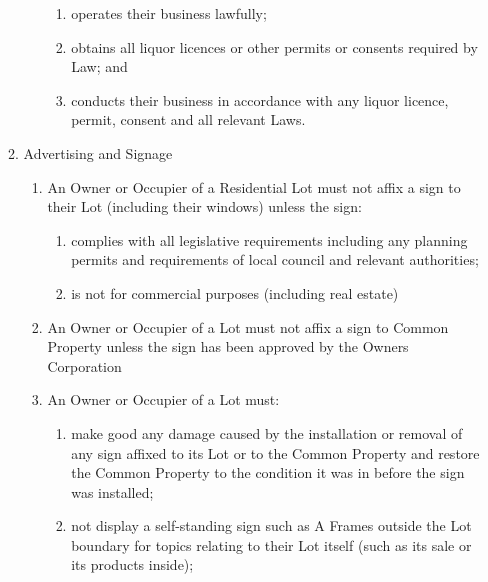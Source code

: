 \documentclass{article}
\begin{document}
\begin{enumerate}[label=\arabic*.]
\begin{enumerate}[label=\arabic{enumi}.\arabic*.]
\begin{enumerate}[label=(\arabic*)]
\begin{enumerate}[label=(\alph*)]

\item  operates their business lawfully;

\item  obtains all liquor licences or other permits or consents required by Law; and

\item  conducts their business in accordance with any liquor licence, permit, consent and all relevant Laws.

\end{enumerate}

\end{enumerate}

\item  Advertising and Signage

\begin{enumerate}[label=(\arabic*)]

\item  An Owner or Occupier of a Residential Lot must not affix a sign to their Lot (including their windows) unless the sign:

\begin{enumerate}[label=(\alph*)]

\item  complies with all legislative requirements including any planning permits and requirements of local council and relevant authorities;

\item is not for commercial purposes (including real estate)

\end{enumerate}

\item An Owner or Occupier of a Lot must not affix a sign to Common Property unless the sign has been approved by the Owners Corporation


\item  An Owner or Occupier of a Lot must:

\begin{enumerate}[label=(\alph*)]

\item  make good any damage caused by the installation or removal of any sign affixed to its Lot or to the Common Property and restore the Common Property to the condition it was in before the sign was installed;

\item  not display a self-standing sign such as A Frames outside the Lot boundary for topics relating to their Lot itself (such as its sale or its products inside);


\end{enumerate}
\end{enumerate}
\end{enumerate}
\end{enumerate}
\end{document}
